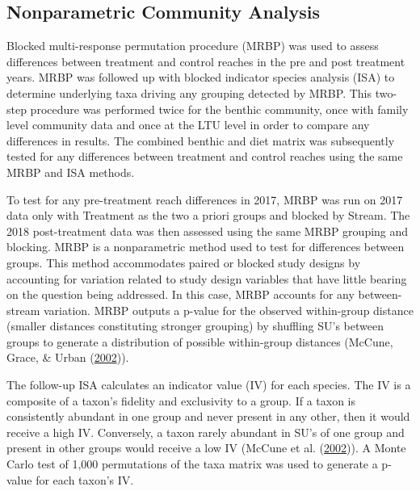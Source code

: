 \documentclass[double,12pt]{beavtex}
\begin{document}
  \subsection*{Nonparametric Community
  Analysis}\label{nonparametric-community-analysis}
  
  Blocked multi-response permutation procedure (MRBP) was used to assess
  differences between treatment and control reaches in the pre and post
  treatment years. MRBP was followed up with blocked indicator species
  analysis (ISA) to determine underlying taxa driving any grouping
  detected by MRBP. This two-step procedure was performed twice for the
  benthic community, once with family level community data and once at the
  LTU level in order to compare any differences in results. The combined
  benthic and diet matrix was subsequently tested for any differences
  between treatment and control reaches using the same MRBP and ISA
  methods.
  
  To test for any pre-treatment reach differences in 2017, MRBP was run on
  2017 data only with Treatment as the two a priori groups and blocked by
  Stream. The 2018 post-treatment data was then assessed using the same
  MRBP grouping and blocking. MRBP is a nonparametric method used to test
  for differences between groups. This method accommodates paired or
  blocked study designs by accounting for variation related to study
  design variables that have little bearing on the question being
  addressed. In this case, MRBP accounts for any between-stream variation.
  MRBP outputs a p-value for the observed within-group distance (smaller
  distances constituting stronger grouping) by shuffling SU's between
  groups to generate a distribution of possible within-group distances
  (McCune, Grace, \& Urban (\protect\hyperlink{ref-McCune2002}{2002})).
  
  The follow-up ISA calculates an indicator value (IV) for each species.
  The IV is a composite of a taxon's fidelity and exclusivity to a group.
  If a taxon is consistently abundant in one group and never present in
  any other, then it would receive a high IV. Conversely, a taxon rarely
  abundant in SU's of one group and present in other groups would receive
  a low IV (McCune et al. (\protect\hyperlink{ref-McCune2002}{2002})). A
  Monte Carlo test of 1,000 permutations of the taxa matrix was used to
  generate a p-value for each taxon's IV.
  
\end{document}
